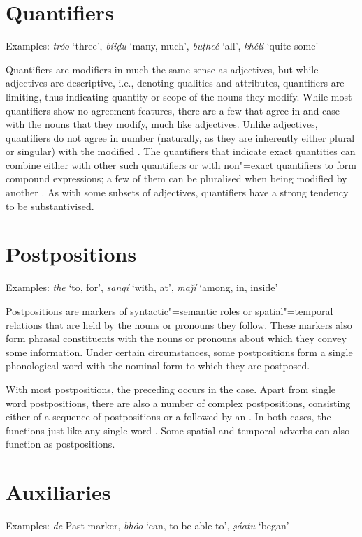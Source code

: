 \section{Quantifiers}
\label{sec:3b-8}
Examples: \textit{tróo} `three', \textit{bíiḍu} `many, much', \textit{buṭheé} `all', \textit{khéli} `quite some'


Quantifiers are modifiers in much the same sense as adjectives, but while adjectives are descriptive, i.e., denoting qualities and attributes, quantifiers are limiting, thus indicating quantity or scope of the nouns they modify. While most quantifiers show no agreement features, there are a few that agree in  and case with the nouns that they modify, much like adjectives. Unlike adjectives, quantifiers do not agree in number (naturally, as they are inherently either plural or singular) with the modified . The quantifiers that indicate exact quantities can combine either with other such quantifiers or with non"=exact quantifiers to form compound  expressions; a few of them can be pluralised when being modified by another . As with some subsets of adjectives, quantifiers have a strong tendency to be substantivised.


\section{Postpositions}
\label{sec:3b-9}
Examples: \textit{the} `to, for', \textit{sangí} `with, at', \textit{maǰí} `among, in, inside'


Postpositions are markers of syntactic"=semantic roles or spatial"=temporal relations that are held by the nouns or pronouns they follow. These markers also form phrasal constituents with the nouns or pronouns about which they convey some information. Under certain circumstances, some postpositions form a single phonological word with the nominal form to which they are postposed.  


With most postpositions, the preceding  occurs in the  case. Apart from single word postpositions, there are also a number of complex postpositions, consisting either of a sequence of postpositions or a  followed by an . In both cases, the  functions just like any single word . Some spatial and temporal adverbs can also function as postpositions.


\section{Auxiliaries}
\label{sec:3b-10}
Examples: \textit{de} Past  marker, \textit{bhóo} `can, to be able to', \textit{ṣáatu} `began'


